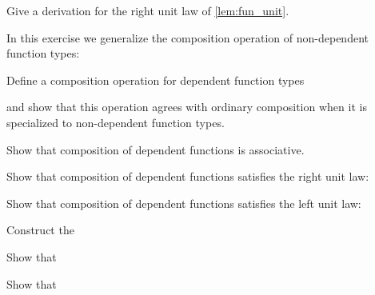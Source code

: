 \begin{exercises}
\item \label{ex:fun_right_unit}Give a derivation for the right unit law of \autoref{lem:fun_unit}.
\item In this exercise we generalize the composition operation of non-dependent function types:
\begin{subexenum}
\item Define a composition operation for dependent function types
\begin{prooftree}
\end{prooftree}
and show that this operation agrees with ordinary composition when it is specialized to non-dependent function types.
\item Show that composition of dependent functions is associative.
\item Show that composition of dependent functions satisfies the right unit law:
\begin{prooftree}
\end{prooftree}
\item Show that composition of dependent functions satisfies the left unit law:
\begin{prooftree}
\end{prooftree}
\end{subexenum}
\item 
\begin{subexenum}
\item Construct the  
\begin{prooftree}
\end{prooftree}
\item Show that
\begin{prooftree}
\end{prooftree}
\item Show that
\begin{prooftree}

\end{prooftree}
\end{subexenum}
\end{exercises}
